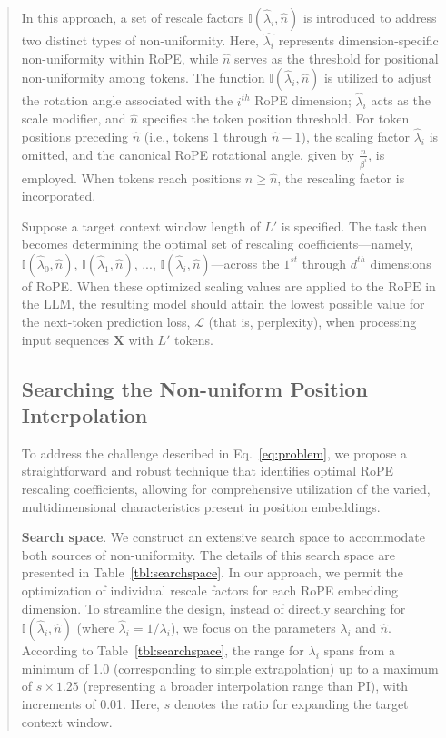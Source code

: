 \begin{abstract}
In this approach, a set of rescale factors $\mathbb{I}(\hat{\lambda}_{i},\hat{n})$ is introduced to address two distinct types of non-uniformity. Here, $\hat{\lambda_i}$ represents dimension-specific non-uniformity within RoPE, while $\hat{n}$ serves as the threshold for positional non-uniformity among tokens. The function $\mathbb{I}(\hat{\lambda}_{i},\hat{n})$ is utilized to adjust the rotation angle associated with the $i^{th}$ RoPE dimension; $\hat\lambda_{i}$ acts as the scale modifier, and $\hat{n}$ specifies the token position threshold. For token positions preceding $\hat{n}$ (i.e., tokens $1$ through $\hat{n}-1$), the scaling factor $\hat\lambda_{i}$ is omitted, and the canonical RoPE rotational angle, given by $\frac{n}{\beta^i}$, is employed. When tokens reach positions $n\ge\hat{n}$, the rescaling factor is incorporated.

Suppose a target context window length of $L'$ is specified. The task then becomes determining the optimal set of rescaling coefficients—namely, $\mathbb{I}(\hat{\lambda}_{0},\hat{n})$, $\mathbb{I}(\hat{\lambda}_{1},\hat{n})$, ..., $\mathbb{I}(\hat{\lambda}_{i},\hat{n})$—across the $1^{st}$ through $d^{th}$ dimensions of RoPE. When these optimized scaling values are applied to the $\text{RoPE}$ in the $\text{LLM}$, the resulting model should attain the lowest possible value for the next-token prediction loss, $\mathcal{L}$ (that is, perplexity), when processing input sequences $\mathbf{X}$ with $L'$ tokens.

\subsection{Searching the Non-uniform Position Interpolation}

To address the challenge described in Eq.~\ref{eq:problem}, we propose a straightforward and robust technique that identifies optimal RoPE rescaling coefficients, allowing for comprehensive utilization of the varied, multidimensional characteristics present in position embeddings.

\textbf{Search space}. We construct an extensive search space to accommodate both sources of non-uniformity. The details of this search space are presented in Table~\ref{tbl:searchspace}. In our approach, we permit the optimization of individual rescale factors for each RoPE embedding dimension. To streamline the design, instead of directly searching for $\mathbb{I}(\hat{\lambda}_{i},\hat{n})$ (where $\hat{\lambda}_{i}=1/\lambda_i$), we focus on the parameters $\lambda_i$ and $\hat{n}$. According to Table~\ref{tbl:searchspace}, the range for $\lambda_i$ spans from a minimum of 1.0 (corresponding to simple extrapolation) up to a maximum of $s\times1.25$ (representing a broader interpolation range than PI), with increments of 0.01. Here, $s$ denotes the ratio for expanding the target context window.


\end{abstract}
